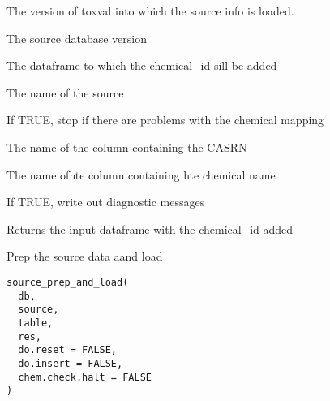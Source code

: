 \documentclass[letterpaper]{book}
\begin{document}
\begin{Arguments}
\begin{ldescription}
\item[\code{toxval.db}] The version of toxval into which the source info is loaded.

\item[\code{source.db}] The source database version

\item[\code{res}] The dataframe to which the chemical\_id sill be added

\item[\code{source}] The name of the source

\item[\code{chem.check.halt}] If TRUE, stop if there are problems with the chemical mapping

\item[\code{casrn.col}] The name of the column containing the CASRN

\item[\code{name.col}] The name ofhte column containing hte chemical name

\item[\code{verbose}] If TRUE, write out diagnostic messages
\end{ldescription}
\end{Arguments}
%
\begin{Value}
Returns the input dataframe with the chemical\_id added
\end{Value}
%
\begin{Description}\relax
Prep the source data aand load
\end{Description}
%
\begin{Usage}
\begin{verbatim}
source_prep_and_load(
  db,
  source,
  table,
  res,
  do.reset = FALSE,
  do.insert = FALSE,
  chem.check.halt = FALSE
)
\end{verbatim}
\end{Usage}
%
\end{document}
